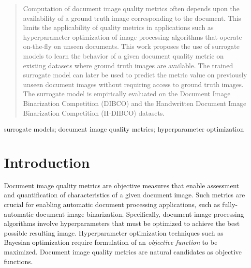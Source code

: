 \documentclass[10pt, a4paper, conference, compsocconf]{IEEEtran}
\begin{document}
\begin{abstract}
Computation of document image quality metrics often depends upon the availability of a ground truth image corresponding to the document. This limits the applicability of quality metrics in applications such as hyperparameter optimization of image processing algorithms that operate on-the-fly on unseen documents. This work proposes the use of surrogate models to learn the behavior of a given document quality metric on existing datasets where ground truth images are available. The trained surrogate model can later be used to predict the metric value on previously unseen document images without requiring access to ground truth images. The surrogate model is empirically evaluated on the Document Image Binarization Competition (DIBCO) and the Handwritten Document Image Binarization Competition (H-DIBCO) datasets.

\end{abstract}

\begin{IEEEkeywords}
surrogate models; document image quality metrics; hyperparameter optimization

\end{IEEEkeywords}


%
\IEEEpeerreviewmaketitle



\section{Introduction}
\label{sec:intro}

Document image quality metrics are objective measures that enable assessment and quantification of characteristics of a given document image. Such metrics are crucial for enabling automatic document processing applications, such as fully-automatic document image binarization. Specifically, document image processing algorithms involve hyperparameters that must be optimized to achieve the best possible resulting image. Hyperparameter optimization techniques such as Bayesian optimization \cite{snoek2012practical} require formulation of an \emph{objective function} to be maximized. Document image quality metrics are natural candidates as objective functions. 
\end{document}
